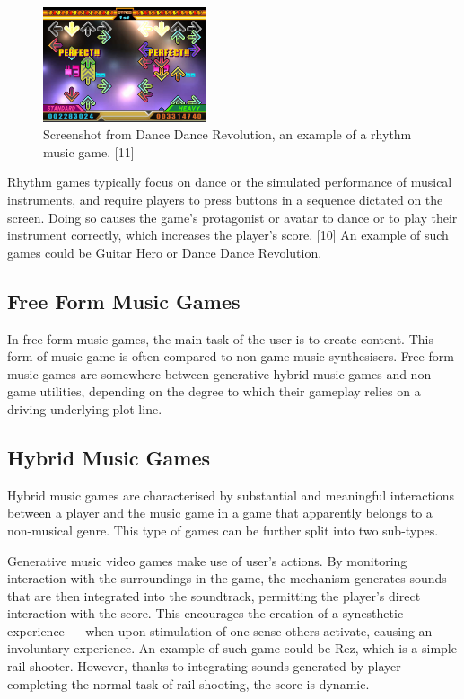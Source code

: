 \begin{figure}
  \vspace{-40pt}

  \begin{center}
    \includegraphics[width=0.43\textwidth]{Figures/dancedancerevolution}
  \end{center}
  \caption{Screenshot from Dance Dance Revolution, an example of a rhythm music game. [11]}
\end{figure}

Rhythm games typically focus on dance or the simulated performance of musical instruments, and require players to press buttons in a sequence dictated on the screen. Doing so causes the game's protagonist or avatar to dance or to play their instrument correctly, which increases the player's score. [10] An example of such games could be Guitar Hero or Dance Dance Revolution.


\subsection{Free Form Music Games}

In free form music games, the main task of the user is to create content. This form of music game is often compared to non-game music synthesisers. Free form music games are somewhere between generative hybrid music games and non-game utilities, depending on the degree to which their gameplay relies on a driving underlying plot-line.


\subsection{Hybrid Music Games}

Hybrid music games are characterised by substantial and meaningful interactions between a player and the music game in a game that apparently belongs to a non-musical genre. This type of games can be further split into two sub-types.


Generative music video games make use of user’s actions. By monitoring interaction with the surroundings in the game, the mechanism generates sounds that are then integrated into the soundtrack, permitting the player’s direct interaction with the score. This encourages the creation of a synesthetic experience — when upon stimulation of one sense others activate, causing an involuntary experience. An example of such game could be Rez, which is a simple rail shooter. However, thanks to integrating sounds generated by player completing the normal task of rail-shooting, the score is dynamic.

